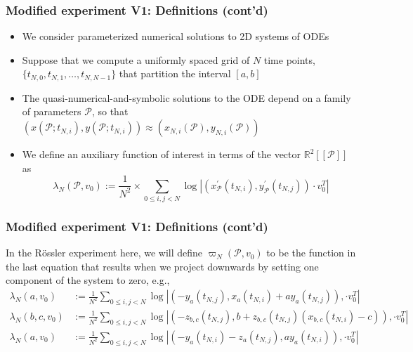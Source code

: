 \documentclass[usenames,svgnames,dvipsnames,10pt]{beamer}
\begin{document}
\begin{frame}
\frametitle{Modified experiment V1: Definitions (cont'd)}

\begin{itemize} 

\item We consider parameterized numerical solutions to 2D systems of ODEs
\item Suppose that we compute a uniformly spaced 
      grid of $N$ time points, $\{t_{N,0}, t_{N,1}, \ldots, t_{N,N-1}\}$ that partition the interval $[a, b]$ 
\item The quasi-numerical-and-symbolic solutions to the ODE 
      depend on a family of parameters $\mathcal{P}$, so that 
      $(x(\mathcal{P}; t_{N,i}), y(\mathcal{P}; t_{N,i})) \approx (x_{N,i}(\mathcal{P}), y_{N,i}(\mathcal{P}))$ 
\item We define an auxiliary function of interest in terms of the vector $\mathbb{R}^2[[\mathcal{P}]]$ as 
      \[
      \lambda_N(\mathcal{P}, v_0) := \frac{1}{N^2} \times \sum_{0 \leq i, j < N} \log\left\lvert 
           (x_{\mathcal{P}}^{\prime}(t_{N,i}), y_{\mathcal{P}}^{\prime}(t_{N,j})) \cdot v_0^T \right\rvert 
      \]

\end{itemize} 

\end{frame}

\begin{frame}
\frametitle{Modified experiment V1: Definitions (cont'd)}

In the R\"ossler experiment here, we will define $\varpi_N(\mathcal{P}, v_0)$ 
      to be the function in the last equation that results when we project downwards by setting one component of 
      the system to zero, e.g., 
      \begin{align}
      \tag{Projection to $XY$ Case -- Linear} 
      \lambda_N(a, v_0) & := \frac{1}{N^2} \sum_{0 \leq i, j < N} \log\left\lvert 
           (-y_a(t_{N,j}), x_a(t_{N,i}) + a y_a(t_{N,j})),  \cdot v_0^T \right\rvert \\ 
      \tag{Projection to $XZ$ Case -- Non-Linear} 
      \lambda_N(b, c, v_0) & := \frac{1}{N^2} \sum_{0 \leq i, j < N} \log\left\lvert 
           (-z_{b,c}(t_{N,j}), b + z_{b,c}(t_{N,j})(x_{b,c}(t_{N,i}) - c)),  \cdot v_0^T \right\rvert \\ 
      \tag{Projection to $YZ$ Case -- Linear} 
      \lambda_N(a, v_0) & := \frac{1}{N^2} \sum_{0 \leq i, j < N} \log\left\lvert 
           (-y_a(t_{N,i})-z_a(t_{N,j}), a y_a(t_{N,i})),  \cdot v_0^T \right\rvert 
      \end{align}

\end{frame}
\end{document}
